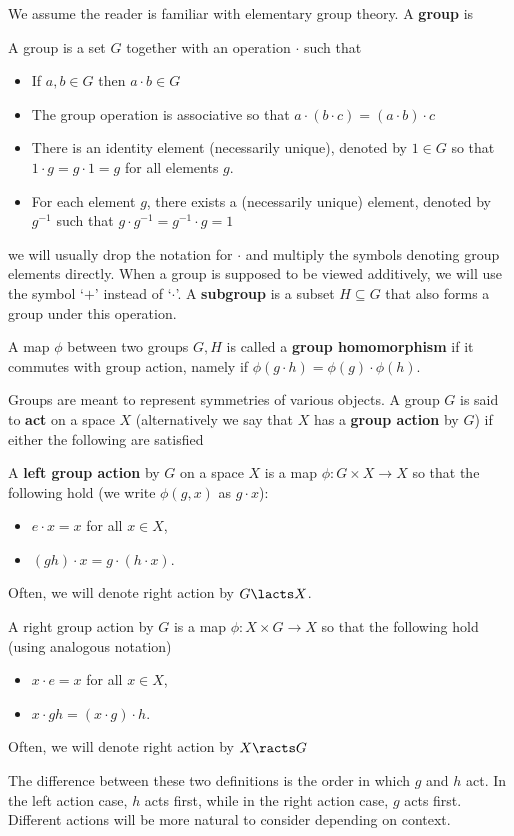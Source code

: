 		We assume the reader is familiar with elementary group theory. A \textbf{group} is 
		\begin{defn}[Group]
			A group is a set $G$ together with an operation $\cdot$ such that
			\begin{itemize}
				\item If $a, b \in G$ then $a\cdot b \in G$
				\item The group operation is associative so that $a \cdot (b \cdot c) = (a \cdot b) \cdot c$
				\item There is an identity element (necessarily unique), denoted by $1 \in G$ so that $1 \cdot g = g \cdot 1 = g$ for all elements $g$.
				\item For each element $g$, there exists a (necessarily unique) element, denoted by $g^{-1}$ such that $g \cdot g^{-1} = g^{-1} \cdot g = 1$ 
			\end{itemize}
		\end{defn}
		we will usually drop the notation for $\cdot$ and multiply the symbols denoting group elements directly. When a group is supposed to be viewed additively, we will use the symbol `$+$' instead of `$\cdot$'. A \textbf{subgroup} is a subset $H \subseteq G$ that also forms a group under this operation.
		
		A map $\phi$ between two groups $G, H$ is called a \textbf{group homomorphism} if it commutes with group action, namely if $\phi(g \cdot h) = \phi(g) \cdot \phi(h)$.
		
		Groups are meant to represent symmetries of various objects. A group $G$ is said to \textbf{act} on a space $X$ (alternatively we say that $X$ has a \textbf{group action} by $G$) if either the following are satisfied
		\begin{defn}
			A \textbf{left group action} by $G$ on a space $X$ is a map $\phi: G \times X \to X$ so that the following hold (we write $\phi(g, x)$ as $g\cdot x$):
			\begin{itemize}
				\item $e \cdot x = x$ for all $x \in X$,
				\item $(gh)\cdot x = g\cdot(h \cdot x)$. 
			\end{itemize}
			Often, we will denote right action by $G \lacts X$.
			
			A right group action by $G$ is a map $\phi: X \times G \to X$ so that the following hold (using analogous notation)
			\begin{itemize}
				\item $x \cdot e = x$ for all $x \in X$,
				\item $x \cdot gh = (x \cdot g) \cdot h$.
			\end{itemize}
			Often, we will denote right action by $X \racts G$
		\end{defn}
		The difference between these two definitions is the order in which $g$ and $h$ act. In the left action case, $h$ acts first, while in the right action case, $g$ acts first. Different actions will be more natural to consider depending on context.
		
